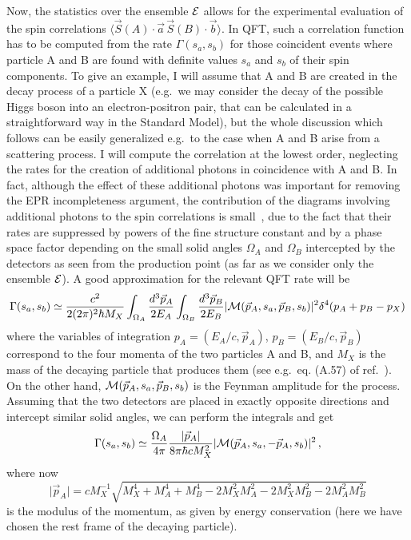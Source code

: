 \documentclass[12pt]{article}
\begin{document}
Now, the statistics over the ensemble ${\cal E}$ allows for the
experimental evaluation of the spin correlations $\langle\vec S(A)
\cdot\vec a \,\vec S(B)\cdot\vec b\rangle$. In QFT, such a correlation
function has to be computed from the rate $\Gamma(s_a,s_b)$ for those
coincident events where particle A and B are found with definite
values $s_a$ and $s_b$ of their spin components. To give an example, I
will assume that A and B are created in the decay process of a
particle X (e.g.\ we may consider the decay of the possible Higgs
boson into an electron-positron pair, that can be calculated in a
straightforward way in the Standard Model), but the whole discussion
which follows can be easily generalized e.g.\ to the case when A and B
arise from a scattering process. I will compute the correlation at the
lowest order, neglecting the rates for the creation of additional
photons in coincidence with A and B. In fact, although the effect of
these additional photons was important for removing the EPR
incompleteness argument, the contribution of the diagrams involving
additional photons to the spin correlations is small~\cite{pureprp},
due to the fact that their rates are suppressed by powers of the fine
structure constant and by a phase space factor depending on the small
solid angles $\Omega_A$ and $\Omega_B$ intercepted by the detectors as
seen from the production point (as far as we consider only the
ensemble ${\cal E}$). A good approximation for the relevant QFT rate
will be
\begin{equation}
\Gamma(s_a,s_b) \simeq \frac{c^2}{2(2\pi) ^2\hbar
M_X}\int_{\Omega_A}\frac{d^3\vec
p_A}{2E_A}\int_{\Omega_B}\frac{d^3\vec p_B}{2E_B} \vert {\cal M} (\vec
p_A,s_a,\vec p_B,s_b)\vert^2\delta^4(p_A+p_B-p_X)
\label{eq:2}
\end{equation}
where the variables of integration $p_A=(E_A/c,\vec p_A)$,
$p_B=(E_B/c,\vec p_B)$ correspond to the four momenta of the two
particles A and B, and $M_X$ is the mass of the decaying particle that
produces them (see e.g.\ eq. (A.57) of ref.~\cite{Peskin}).  On the
other hand, ${\cal M} (\vec p_A,s_a,\vec p_B,s_b)$ is the Feynman
amplitude for the process. Assuming that the two detectors are placed
in exactly opposite directions and intercept similar solid angles, we
can perform the integrals and get
\begin{equation}
\Gamma(s_a,s_b) \simeq \frac{\Omega_A}{4\pi}\frac{\vert \vec
p_A\vert}{8\pi\hbar c M_X^2} \vert {\cal M} (\vec p_A,s_a,-\vec
p_A,s_b)\vert^2\,, \label{eq:3}
\end{equation}
where now 
$$
\vert \vec p_A\vert =
cM_X^{-1}\sqrt{M_X^4+M_A^4+M_B^4-2M_X^2M_A^2-2M_X^2M_B^2-2M_A^2M_B^2}
$$
is the modulus of the momentum, as given by energy conservation (here
we have chosen the rest frame of the decaying particle).
\end{document}
